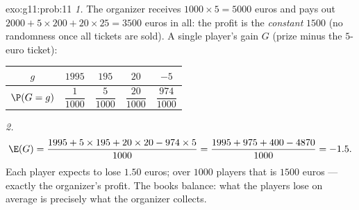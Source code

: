 \begin{solution}{exo:g11:prob:11}
\emph{1.} The organizer receives $1000 \times 5 = 5000$ euros and pays
out $2000 + 5 \times 200 + 20 \times 25 = 3500$ euros in all: the profit
is the \emph{constant} $1500$ (no randomness once all tickets are sold).
A single player's gain $G$ (prize minus the $5$-euro ticket):
\begin{center}
\begin{tabular}{c|cccc}
$g$ & $1995$ & $195$ & $20$ & $-5$\\
\hline\rule{0pt}{11pt}%
$\P(G=g)$ & $\dfrac{1}{1000}$ & $\dfrac{5}{1000}$ & $\dfrac{20}{1000}$
& $\dfrac{974}{1000}$
\end{tabular}
\end{center}

\emph{2.}
\[
\E(G) = \frac{1995 + 5 \times 195 + 20 \times 20 - 974 \times 5}{1000}
= \frac{1995 + 975 + 400 - 4870}{1000} = -1.5 .
\]
Each player expects to lose $1.50$ euros; over $1000$ players that is
$1500$ euros --- exactly the organizer's profit. The books balance:
what the players lose on average is precisely what the organizer
collects.
\end{solution}

